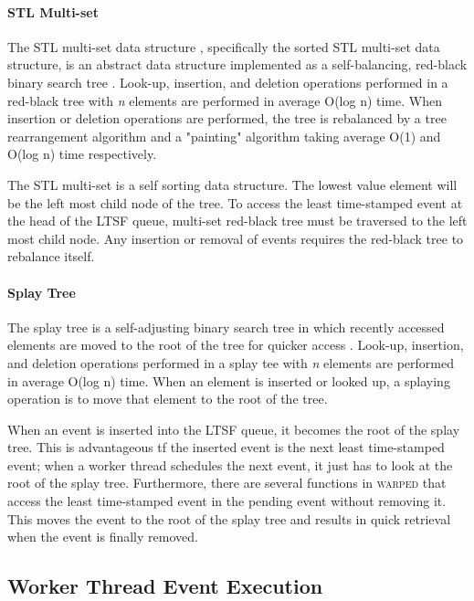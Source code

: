 \documentclass[11pt]{book}
\begin{document}
\paragraph{STL Multi-set}

The STL multi-set data structure , specifically the sorted STL multi-set data
structure, is an abstract data structure implemented as a self-balancing,
red-black binary search tree \cite{redblack}.  Look-up, insertion, and
deletion operations performed in a red-black tree with \emph{n} elements are
performed in average O(log n) time.  When insertion or deletion operations are
performed, the tree is rebalanced by a tree rearrangement algorithm and a
"painting" algorithm taking average O(1) and O(log n) time respectively. 

The STL multi-set is a self sorting data structure.  The lowest value element
will be the left most child node of the tree.  To access the least time-stamped
event at the head of the LTSF queue, multi-set red-black tree must be traversed
to the left most child node.  Any insertion or removal of events requires the
red-black tree to rebalance itself.  

\paragraph{Splay Tree}

The splay tree is a self-adjusting binary search tree in which recently accessed
elements are moved to the root of the tree for quicker access \cite{splaytree}.
Look-up, insertion, and deletion operations performed in a splay tee with
\emph{n} elements are performed in average O(log n) time.  When an element is inserted
or looked up, a splaying operation is to move that element to the root of the
tree.

When an event is inserted into the LTSF queue, it becomes the root of the splay
tree.  This is advantageous tf the inserted event is the next least time-stamped
event; when a worker thread schedules the next event, it just has to look at the
root of the splay tree.  Furthermore, there are several functions in
\textsc{warped} that access the least time-stamped event in the pending event
without removing it.  This moves the event to the root of the splay tree and
results in quick retrieval when the event is finally removed. 

\subsection{Worker Thread Event Execution}
\end{document}
